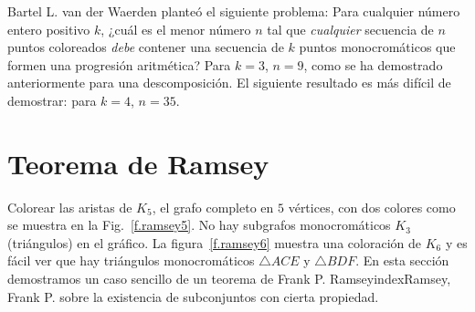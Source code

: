 Bartel L. van der Waerden planteó el siguiente problema: Para cualquier número entero positivo $k$, ¿cuál es el menor número $n$ tal que \emph{cualquier} secuencia de $n$ puntos coloreados \emph{debe} contener una secuencia de $k$ puntos monocromáticos que formen una progresión aritmética? Para $k=3$, $n=9$, como se ha demostrado anteriormente para una descomposición. El siguiente resultado es más difícil de demostrar: para $k=4$, $n=35$.


\section{Teorema de Ramsey}\label{s.ramsey}

Colorear las aristas de $K_5$, el grafo completo en $5$ vértices, con dos colores como se muestra en la Fig.~\ref{f.ramsey5}. No hay subgrafos monocromáticos $K_3$ (triángulos) en el gráfico. La figura~\ref{f.ramsey6} muestra una coloración de $K_6$ y es fácil ver que hay triángulos monocromáticos $\triangle ACE$ y $\triangle BDF$. En esta sección demostramos un caso sencillo de un teorema de Frank P. Ramseyindex{Ramsey, Frank P.} sobre la existencia de subconjuntos con cierta propiedad.
